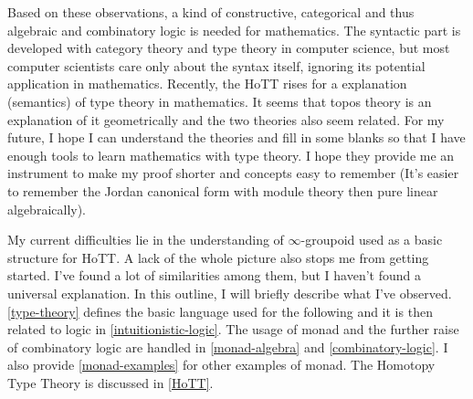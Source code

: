 Based on these observations, a kind of constructive, categorical and 
thus algebraic and combinatory logic is needed for mathematics. The
syntactic part is developed with category theory and type theory in
computer science, but most computer scientists care only about the
syntax itself, ignoring its potential application in mathematics. 
Recently, the HoTT rises for a explanation (semantics)
of type theory in mathematics. It seems that topos theory is an
explanation of it geometrically and the two theories also seem related.
For my future, I hope I can understand the theories and fill in some
blanks so that I have enough tools to learn mathematics with type
theory. I hope they provide me an instrument to make my proof shorter
and concepts easy to remember (It's easier to remember the Jordan
canonical form with module theory then pure linear algebraically).

My current difficulties lie in the understanding of $\infty$-groupoid
used as a basic structure for HoTT. A lack of the whole
picture also stops me from getting started. I've found a lot of 
similarities among them, but I haven't found a universal explanation. 
In this outline, I will briefly describe what I've observed. 
\autoref{type-theory} defines the basic language used for the
following and it is then related to logic in 
\autoref{intuitionistic-logic}. The usage of monad and the further
raise of combinatory logic are handled in \autoref{monad-algebra} and
\autoref{combinatory-logic}. I also provide \autoref{monad-examples}
for other examples of monad. The Homotopy Type Theory is discussed
in \autoref{HoTT}. 